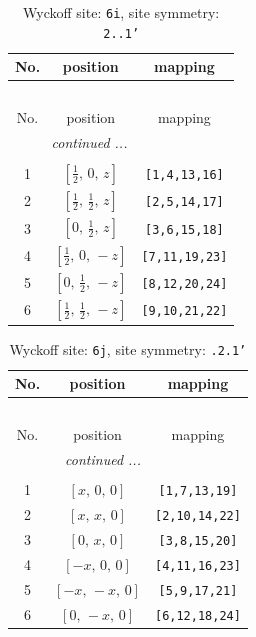 \documentclass[fleqn,8pt]{jsarticle}
\begin{document}
\renewcommand{\arraystretch}{1.2}
\begin{longtable}{ccc}
\caption{Wyckoff site: {\tt 6i}, site symmetry: {\tt 2..1'}}
 \\
 \hline \hline
No. & position & mapping \\ \hline \endfirsthead

\multicolumn{2}{l}{\tablename\ \thetable{}} \\
 \hline \hline
No. & position & mapping \\ \hline \endhead

 \hline \hline
\multicolumn{2}{r}{\footnotesize\it continued ...} \\ \endfoot

 \hline \hline
\multicolumn{2}{r}{} \\ \endlastfoot

1 & $\left[ \frac{1}{2},\, 0,\, z \right]$ & {\tt [1,4,13,16]} \\ \hline
2 & $\left[ \frac{1}{2},\, \frac{1}{2},\, z \right]$ & {\tt [2,5,14,17]} \\ \hline
3 & $\left[ 0,\, \frac{1}{2},\, z \right]$ & {\tt [3,6,15,18]} \\ \hline
4 & $\left[ \frac{1}{2},\, 0,\, - z \right]$ & {\tt [7,11,19,23]} \\ \hline
5 & $\left[ 0,\, \frac{1}{2},\, - z \right]$ & {\tt [8,12,20,24]} \\ \hline
6 & $\left[ \frac{1}{2},\, \frac{1}{2},\, - z \right]$ & {\tt [9,10,21,22]} \\
\end{longtable}
\renewcommand{\arraystretch}{1.2}
\begin{longtable}{ccc}
\caption{Wyckoff site: {\tt 6j}, site symmetry: {\tt .2.1'}}
 \\
 \hline \hline
No. & position & mapping \\ \hline \endfirsthead

\multicolumn{2}{l}{\tablename\ \thetable{}} \\
 \hline \hline
No. & position & mapping \\ \hline \endhead

 \hline \hline
\multicolumn{2}{r}{\footnotesize\it continued ...} \\ \endfoot

 \hline \hline
\multicolumn{2}{r}{} \\ \endlastfoot

1 & $\left[ x,\, 0,\, 0 \right]$ & {\tt [1,7,13,19]} \\ \hline
2 & $\left[ x,\, x,\, 0 \right]$ & {\tt [2,10,14,22]} \\ \hline
3 & $\left[ 0,\, x,\, 0 \right]$ & {\tt [3,8,15,20]} \\ \hline
4 & $\left[ - x,\, 0,\, 0 \right]$ & {\tt [4,11,16,23]} \\ \hline
5 & $\left[ - x,\, - x,\, 0 \right]$ & {\tt [5,9,17,21]} \\ \hline
6 & $\left[ 0,\, - x,\, 0 \right]$ & {\tt [6,12,18,24]} \\
\end{longtable}
\end{document}
